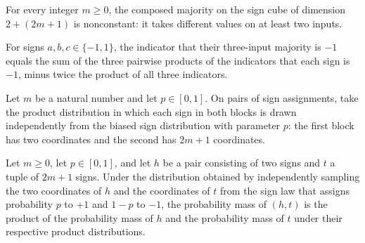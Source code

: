 \begin{theorem}
\label{FABL.composedMajority_isNonconstant}
\leanok
{}
For every integer $m\ge 0$, the composed majority on the sign cube of dimension
$2+(2m+1)$ is nonconstant: it takes different values on at least two inputs.
\end{theorem}

\begin{theorem}
\label{FABL.majorityThreeValue_neg_indicator}
\leanok
{}
For signs $a,b,c\in\{-1,1\}$, the indicator that their three-input majority is $-1$
equals the sum of the three pairwise products of the indicators that each sign is $-1$,
minus twice the product of all three indicators.
\end{theorem}

\begin{definition}
\label{FABL.composedMajoritySplitPMF}
\leanok
{}
Let $m$ be a natural number and let $p\in[0,1]$. On pairs of sign assignments, take the
product distribution in which each sign in both blocks is drawn independently from the
biased sign distribution with parameter $p$: the first block has two coordinates and the
second has $2m+1$ coordinates.
\end{definition}

\begin{theorem}
\label{FABL.composedMajoritySplitPMF_apply}
\leanok
{}
Let $m\ge 0$, let $p\in[0,1]$, and let $h$ be a pair consisting of two signs and $t$ a
tuple of $2m+1$ signs. Under the distribution obtained by independently sampling the two
coordinates of $h$ and the coordinates of $t$ from the sign law that assigns probability
$p$ to $+1$ and $1-p$ to $-1$, the probability mass of $(h,t)$ is the product of the
probability mass of $h$ and the probability mass of $t$ under their respective product
distributions.
\end{theorem}

